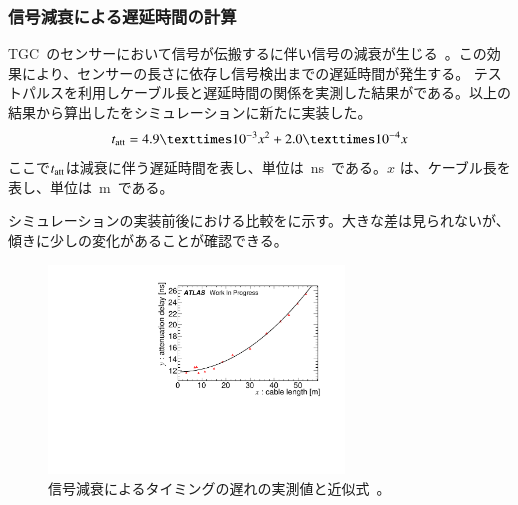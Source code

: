 \subsubsection{信号減衰による遅延時間の計算}
TGC~のセンサーにおいて信号が伝搬するに伴い信号の減衰が生じる~\cite{MT:04}。この効果により、センサーの長さに依存し信号検出までの遅延時間が発生する。
テストパルスを利用しケーブル長と遅延時間の関係を実測した結果がである。以上の結果から算出したをシミュレーションに新たに実装した。
\begin{align}
    t_{\rm{att}} =4.9×10^{-3}x^2+2.0×10^{-4}x
     \label{eq:delay}
\end{align}
ここで$t_{\rm{att}}$は減衰に伴う遅延時間を表し、単位は~ns~である。$x$ は、ケーブル長を表し、単位は~m~である。

シミュレーションの実装前後における比較をに示す。大きな差は見られないが、傾きに少しの変化があることが確認できる。


\begin{figure}[tbp]
    \centering   
    \includegraphics[width=0.7\textwidth,page=1]{img/plot/attk.pdf}
    \caption[信号減衰によるタイミングの遅れの実測値と近似式]{信号減衰によるタイミングの遅れの実測値と近似式~\cite{MT:04}。}
    \label{fig:att0}
\end{figure}

